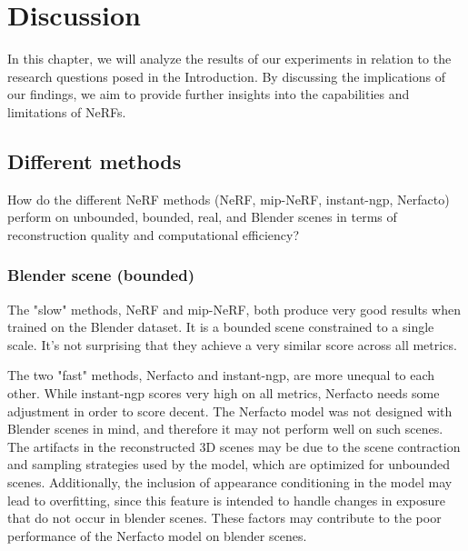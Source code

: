 \begin{comment}
- Loop back to the introduction, review - claim - agenda
    - In this thesis, we have seen how we can reconstruct 3D scenes and render novel views by optimizing NeRFs on 2D input images.
    - The pipeline for creating NeRFs has become greatly simplified recently. As we've seen we can without problems optimize a NeRF in ~4.5 minutes.


Results:
- Dataset size
- Different methods
- Capture method
- NeRF in VR

- Area size
\end{comment}

\chapter{Discussion}
In this chapter, we will analyze the results of our experiments in relation to the research questions posed in the Introduction. By discussing the implications of our findings, we aim to provide further insights into the capabilities and limitations of NeRFs.


\section{Different methods}
\begin{description}[leftmargin=!,labelwidth=\widthof{RQ 1:}]
\item[\textbf{RQ 1:}]
How do the different NeRF methods (NeRF, mip-NeRF, instant-ngp, Nerfacto) perform on unbounded, bounded, real, and Blender scenes in terms of reconstruction quality and computational efficiency?
\end{description}

\subsection{Blender scene (bounded)} \label{sec:blender-scene}
The "slow" methods, NeRF and mip-NeRF, both produce very good results when trained on the Blender dataset. It is a bounded scene constrained to a single scale. It's not surprising that they achieve a very similar score across all metrics.

The two "fast" methods, Nerfacto and instant-ngp, are more unequal to each other. While instant-ngp scores very high on all metrics, Nerfacto needs some adjustment in order to score decent. The Nerfacto model was not designed with Blender scenes in mind, and therefore it may not perform well on such scenes. The artifacts in the reconstructed 3D scenes may be due to the scene contraction and sampling strategies used by the model, which are optimized for unbounded scenes. Additionally, the inclusion of appearance conditioning in the model may lead to overfitting, since this feature is intended to handle changes in exposure that do not occur in blender scenes. These factors may contribute to the poor performance of the Nerfacto model on blender scenes.

